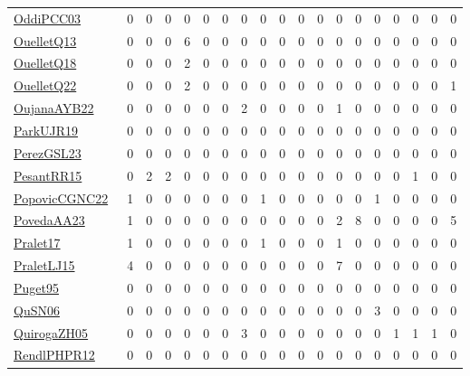 {\begin{longtable}{l*{18}{r}}
\href{papers/OddiPCC03.pdf}{OddiPCC03}~\cite{OddiPCC03} & 0 & 0 & 0 & 0 & 0 & 0 & 0 & 0 & 0 & 0 & 0 & 0 & 0 & 0 & 0 & 0 & 0 & 0\\
\href{papers/OuelletQ13.pdf}{OuelletQ13}~\cite{OuelletQ13} & 0 & 0 & 0 & 6 & 0 & 0 & 0 & 0 & 0 & 0 & 0 & 0 & 0 & 0 & 0 & 0 & 0 & 0\\
\href{papers/OuelletQ18.pdf}{OuelletQ18}~\cite{OuelletQ18} & 0 & 0 & 0 & 2 & 0 & 0 & 0 & 0 & 0 & 0 & 0 & 0 & 0 & 0 & 0 & 0 & 0 & 0\\
\href{papers/OuelletQ22.pdf}{OuelletQ22}~\cite{OuelletQ22} & 0 & 0 & 0 & 2 & 0 & 0 & 0 & 0 & 0 & 0 & 0 & 0 & 0 & 0 & 0 & 0 & 0 & 1\\
\href{papers/OujanaAYB22.pdf}{OujanaAYB22}~\cite{OujanaAYB22} & 0 & 0 & 0 & 0 & 0 & 0 & 2 & 0 & 0 & 0 & 0 & 1 & 0 & 0 & 0 & 0 & 0 & 0\\
\href{papers/ParkUJR19.pdf}{ParkUJR19}~\cite{ParkUJR19} & 0 & 0 & 0 & 0 & 0 & 0 & 0 & 0 & 0 & 0 & 0 & 0 & 0 & 0 & 0 & 0 & 0 & 0\\
\href{papers/PerezGSL23.pdf}{PerezGSL23}~\cite{PerezGSL23} & 0 & 0 & 0 & 0 & 0 & 0 & 0 & 0 & 0 & 0 & 0 & 0 & 0 & 0 & 0 & 0 & 0 & 0\\
\href{papers/PesantRR15.pdf}{PesantRR15}~\cite{PesantRR15} & 0 & 2 & 2 & 0 & 0 & 0 & 0 & 0 & 0 & 0 & 0 & 0 & 0 & 0 & 0 & 1 & 0 & 0\\
\href{papers/PopovicCGNC22.pdf}{PopovicCGNC22}~\cite{PopovicCGNC22} & 1 & 0 & 0 & 0 & 0 & 0 & 0 & 1 & 0 & 0 & 0 & 0 & 0 & 1 & 0 & 0 & 0 & 0\\
\href{papers/PovedaAA23.pdf}{PovedaAA23}~\cite{PovedaAA23} & 1 & 0 & 0 & 0 & 0 & 0 & 0 & 0 & 0 & 0 & 0 & 2 & 8 & 0 & 0 & 0 & 0 & 5\\
\href{papers/Pralet17.pdf}{Pralet17}~\cite{Pralet17} & 1 & 0 & 0 & 0 & 0 & 0 & 0 & 1 & 0 & 0 & 0 & 1 & 0 & 0 & 0 & 0 & 0 & 0\\
\href{papers/PraletLJ15.pdf}{PraletLJ15}~\cite{PraletLJ15} & 4 & 0 & 0 & 0 & 0 & 0 & 0 & 0 & 0 & 0 & 0 & 7 & 0 & 0 & 0 & 0 & 0 & 0\\
\href{papers/Puget95.pdf}{Puget95}~\cite{Puget95} & 0 & 0 & 0 & 0 & 0 & 0 & 0 & 0 & 0 & 0 & 0 & 0 & 0 & 0 & 0 & 0 & 0 & 0\\
\href{papers/QuSN06.pdf}{QuSN06}~\cite{QuSN06} & 0 & 0 & 0 & 0 & 0 & 0 & 0 & 0 & 0 & 0 & 0 & 0 & 0 & 3 & 0 & 0 & 0 & 0\\
\href{papers/QuirogaZH05.pdf}{QuirogaZH05}~\cite{QuirogaZH05} & 0 & 0 & 0 & 0 & 0 & 0 & 3 & 0 & 0 & 0 & 0 & 0 & 0 & 0 & 1 & 1 & 1 & 0\\
\href{papers/RendlPHPR12.pdf}{RendlPHPR12}~\cite{RendlPHPR12} & 0 & 0 & 0 & 0 & 0 & 0 & 0 & 0 & 0 & 0 & 0 & 0 & 0 & 0 & 0 & 0 & 0 & 0\\

\end{longtable}}
